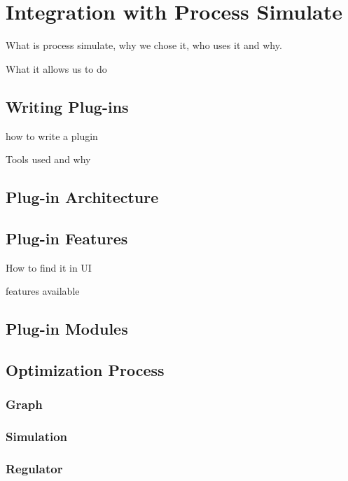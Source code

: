 \chapter{Integration with Process Simulate}
\label{ch:integration}
\graphicspath{{chapters/Integration/}}

What is process simulate, why we chose it, who uses it and why.

What it allows us to do

\section{Writing Plug-ins}

how to write a plugin

Tools used and why

\section{Plug-in Architecture}

\section{Plug-in Features}
How to find it in UI

features available

\section{Plug-in Modules}

\section{Optimization Process}

\subsection{Graph}
\subsection{Simulation}
\subsection{Regulator}
